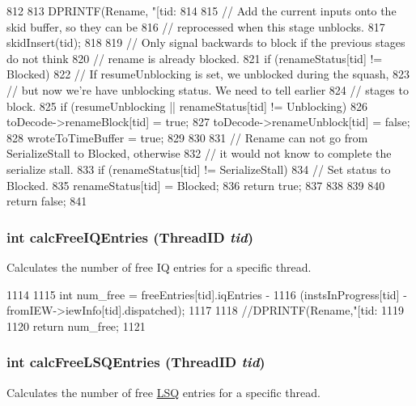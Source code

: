 \begin{DoxyCode}
812 {
813     DPRINTF(Rename, "[tid:%
814 
815     // Add the current inputs onto the skid buffer, so they can be
816     // reprocessed when this stage unblocks.
817     skidInsert(tid);
818 
819     // Only signal backwards to block if the previous stages do not think
820     // rename is already blocked.
821     if (renameStatus[tid] != Blocked) {
822         // If resumeUnblocking is set, we unblocked during the squash,
823         // but now we're have unblocking status. We need to tell earlier
824         // stages to block.
825         if (resumeUnblocking || renameStatus[tid] != Unblocking) {
826             toDecode->renameBlock[tid] = true;
827             toDecode->renameUnblock[tid] = false;
828             wroteToTimeBuffer = true;
829         }
830 
831         // Rename can not go from SerializeStall to Blocked, otherwise
832         // it would not know to complete the serialize stall.
833         if (renameStatus[tid] != SerializeStall) {
834             // Set status to Blocked.
835             renameStatus[tid] = Blocked;
836             return true;
837         }
838     }
839 
840     return false;
841 }
\end{DoxyCode}
\hypertarget{classDefaultRename_a27fa95f1f1dd353635a73f0b56a64e24}{
\subsubsection[{calcFreeIQEntries}]{\setlength{\rightskip}{0pt plus 5cm}int calcFreeIQEntries ({\bf ThreadID} {\em tid})}}
\label{classDefaultRename_a27fa95f1f1dd353635a73f0b56a64e24}
Calculates the number of free IQ entries for a specific thread. 


\begin{DoxyCode}
1114 {
1115     int num_free = freeEntries[tid].iqEntries -
1116                   (instsInProgress[tid] - fromIEW->iewInfo[tid].dispatched);
1117 
1118     //DPRINTF(Rename,"[tid:%
1119 
1120     return num_free;
1121 }
\end{DoxyCode}
\hypertarget{classDefaultRename_a31f50b46622924ea0e53e641b635887c}{
\subsubsection[{calcFreeLSQEntries}]{\setlength{\rightskip}{0pt plus 5cm}int calcFreeLSQEntries ({\bf ThreadID} {\em tid})}}
\label{classDefaultRename_a31f50b46622924ea0e53e641b635887c}
Calculates the number of free \hyperlink{classLSQ}{LSQ} entries for a specific thread. 


